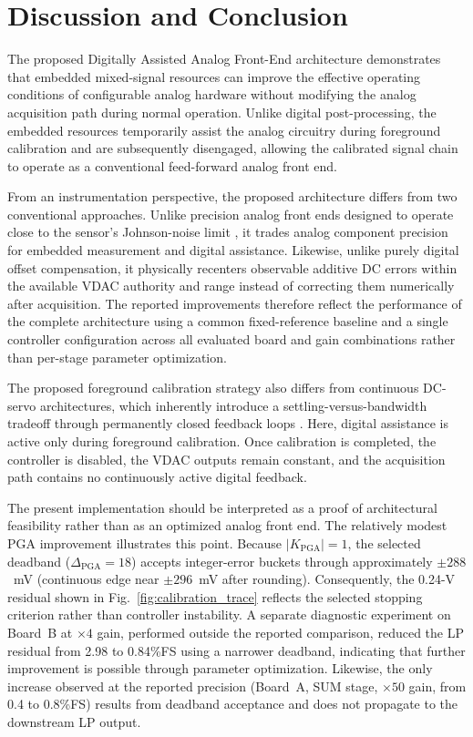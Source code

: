 \section{Discussion and Conclusion}
\label{sec:discussion}

The proposed Digitally Assisted Analog Front-End architecture demonstrates that embedded mixed-signal resources can improve the effective operating conditions of configurable analog hardware without modifying the analog acquisition path during normal operation. Unlike digital post-processing, the embedded resources temporarily assist the analog circuitry during foreground calibration and are subsequently disengaged, allowing the calibrated signal chain to operate as a conventional feed-forward analog front end.

From an instrumentation perspective, the proposed architecture differs from two conventional approaches. Unlike precision analog front ends designed to operate close to the sensor's Johnson-noise limit \cite{Kirchhoff2017}, it trades analog component precision for embedded measurement and digital assistance. Likewise, unlike purely digital offset compensation, it physically recenters observable additive DC errors within the available VDAC authority and range instead of correcting them numerically after acquisition. The reported improvements therefore reflect the performance of the complete architecture using a common fixed-reference baseline and a single controller configuration across all evaluated board and gain combinations rather than per-stage parameter optimization.

The proposed foreground calibration strategy also differs from continuous DC-servo architectures, which inherently introduce a settling-versus-bandwidth tradeoff through permanently closed feedback loops \cite{Liu2020}. Here, digital assistance is active only during foreground calibration. Once calibration is completed, the controller is disabled, the VDAC outputs remain constant, and the acquisition path contains no continuously active digital feedback.

\rev{\label{sec:pga-note}}%
The present implementation should be interpreted as a proof of architectural feasibility rather than as an optimized analog front end. The relatively modest PGA improvement illustrates this point. Because $|K_{\mathrm{PGA}}|=1$, the selected deadband ($\Delta_{\mathrm{PGA}}=18$) accepts integer-error buckets through approximately $\pm288$~mV (continuous edge near $\pm296$~mV after rounding). Consequently, the 0.24-V residual shown in Fig.~\ref{fig:calibration_trace} reflects the selected stopping criterion rather than controller instability. A separate diagnostic experiment on Board~B at $\times4$ gain, performed outside the reported comparison, reduced the LP residual from 2.98 to 0.84\%FS using a narrower deadband, indicating that further improvement is possible through parameter optimization. Likewise, the only increase observed at the reported precision (Board~A, SUM stage, $\times50$ gain, from 0.4 to 0.8\%FS) results from deadband acceptance and does not propagate to the downstream LP output.

